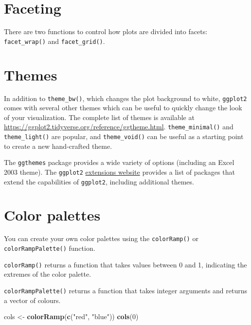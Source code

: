 \documentclass[
]{book}
\newenvironment{Shaded}{\begin{snugshade}}{\end{snugshade}}
\newcommand{\DecValTok}[1]{\textcolor[rgb]{0.00,0.00,0.81}{#1}}
\newcommand{\KeywordTok}[1]{\textcolor[rgb]{0.13,0.29,0.53}{\textbf{#1}}}
\newcommand{\NormalTok}[1]{#1}
\newcommand{\StringTok}[1]{\textcolor[rgb]{0.31,0.60,0.02}{#1}}
\begin{document}
\hypertarget{faceting}{%
\section{Faceting}\label{faceting}}

There are two functions to control how plots are divided into facets: \texttt{facet\_wrap()} and \texttt{facet\_grid()}.

\hypertarget{themes}{%
\section{Themes}\label{themes}}

In addition to \texttt{theme\_bw()}, which changes the plot background to white, \texttt{ggplot2} comes with several other themes which can be useful to quickly change the look of your visualization. The complete list of themes is available at \url{https://ggplot2.tidyverse.org/reference/ggtheme.html}. \texttt{theme\_minimal()} and \texttt{theme\_light()} are popular, and \texttt{theme\_void()} can be useful as a starting point to create a new hand-crafted theme.

The \texttt{ggthemes} package provides a wide variety of options (including an Excel 2003 theme). The \texttt{ggplot2} \href{https://www.ggplot2-exts.org}{extensions website} provides a list of packages that extend the capabilities of \texttt{ggplot2}, including additional themes.

\hypertarget{color-palettes}{%
\section{Color palettes}\label{color-palettes}}

You can create your own color palettes using the \texttt{colorRamp()} or \texttt{colorRampPalette()} function.

\texttt{colorRamp()} returns a function that takes values between 0 and 1, indicating the extremes of the color palette.

\texttt{colorRampPalette()} returns a function that takes integer arguments and returns a vector of colours.

\begin{Shaded}
\begin{Highlighting}[]
\NormalTok{cols <-}\StringTok{ }\KeywordTok{colorRamp}\NormalTok{(}\KeywordTok{c}\NormalTok{(}\StringTok{"red"}\NormalTok{, }\StringTok{"blue"}\NormalTok{))}
\KeywordTok{cols}\NormalTok{(}\DecValTok{0}\NormalTok{)}
\end{Highlighting}
\end{Shaded}
\end{document}
